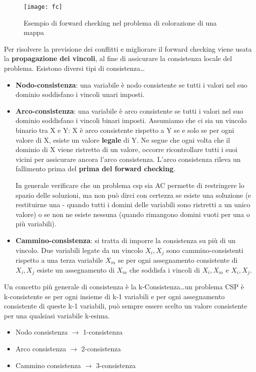 \begin{figure}[H]
\centering
\texttt{[image: fc]}
\caption{Esempio di forward checking nel problema di colorazione di una mappa}
\label{fig:fc}
\end{figure}

Per risolvere la previsione dei conflitti e migliorare il forward checking viene usata
la \textbf{propagazione dei vincoli}, al fine di assicurare la consistenza locale
del problema. Esistono diversi tipi di consistenza\dots

\begin{itemize}
 \item \textbf{Nodo-consistenza}: una variabile è nodo consistente se tutti i valori
nel suo dominio soddisfano i vincoli unari imposti.
 \item \textbf{Arco-consistenza}: una variabile è arco consistente se tutti i valori
nel suo dominio soddisfano i vincoli binari imposti.
Assumiamo che ci sia un vincolo binario tra X e Y: X è arco consistente rispetto a Y
se e solo se per ogni valore di X, esiste un valore \textbf{legale} di Y.
Ne segue che ogni volta che il dominio di X viene ristretto di un valore,
occorre ricontrollare tutti i suoi vicini per assicurare ancora l'arco consistenza.
L'arco consistenza rileva un fallimento prima del \textbf{prima del forward checking}.

In generale verificare che un problema csp sia AC permette di restringere lo spazio
delle soluzioni, ma non può dirci con certezza se esiste una soluzione (e
restituirne una - quando tutti i domini delle variabili sono ristretti a un unico
valore) o se non ne esiste nessuna (quando rimangono domini vuoti per una o più variabili).
 \item \textbf{Cammino-consistenza}: si tratta di imporre la consistenza su più di un
vincolo. Due variabili legate da un vincolo ${X_i, X_j}$ sono cammino-consistenti rispetto
a una terza variabile $X_m$ se per ogni assegnamento consistente di ${X_i, X_j}$ esiste un
assegnamento di $X_m$ che soddisfa i vincoli di ${X_i, X_m}$ e ${X_i, X_j}$.
\end{itemize}

Un concetto più generale di consistenza è la k-Consistenza\dots un problema
CSP è k-consistente se per ogni insieme di k-1 variabili e per ogni assegnamento consistente
di queste k-1 variabili, può sempre essere scelto un valore consistente per una qualsiasi
variabile k-esima.

\begin{itemize}
 \item Nodo consistenza $\rightarrow$ 1-consistenza
 \item Arco consistenza $\rightarrow$ 2-consistenza
 \item Cammino consistenza $\rightarrow$ 3-consistenza
\end{itemize}
